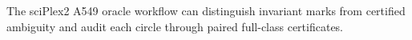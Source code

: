 The sciPlex2 A549 oracle workflow can distinguish invariant marks from certified ambiguity and audit each circle through paired full-class certificates.